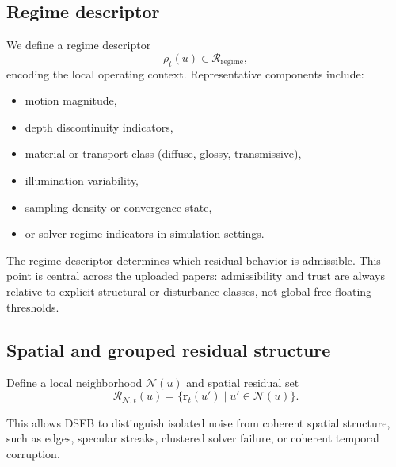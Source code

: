 \documentclass[11pt]{article}
\theoremstyle{definition}
\theoremstyle{plain}
\begin{document}

\subsection{Regime descriptor}

We define a regime descriptor
\begin{equation}
\rho_t(u)\in\mathcal R_{\mathrm{regime}},
\end{equation}
encoding the local operating context. Representative components include:
\begin{itemize}[leftmargin=1.5em]
    \item motion magnitude,
    \item depth discontinuity indicators,
    \item material or transport class (diffuse, glossy, transmissive),
    \item illumination variability,
    \item sampling density or convergence state,
    \item or solver regime indicators in simulation settings.
\end{itemize}

The regime descriptor determines which residual behavior is admissible. This point is central across the uploaded papers: admissibility and trust are always relative to explicit structural or disturbance classes, not global free-floating thresholds. 


\subsection{Spatial and grouped residual structure}

Define a local neighborhood $\mathcal N(u)$ and spatial residual set
\begin{equation}
\mathcal R_{\mathcal N,t}(u)=\{\tilde{\mathbf r}_t(u')\mid u'\in\mathcal N(u)\}.
\end{equation}

This allows DSFB to distinguish isolated noise from coherent spatial structure, such as edges, specular streaks, clustered solver failure, or coherent temporal corruption.
\end{document}
